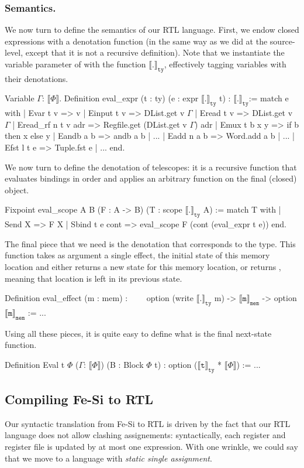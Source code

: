 \documentclass{llncs}
\newcommand{\denote}[1]{\llbracket #1 \rrbracket}
\newcommand{\denotety}[1]{\denote{\mathtt{#1}}_{\mathtt{ty}}}
\newcommand{\denotemem}[1]{\denote{\mathtt{#1}}_{\mathtt{mem}}}
\begin{document}
\subsubsection{Semantics.} We now turn to define the semantics of our RTL
language. 
%
First, we endow closed expressions with a denotation function (in the
same way as we did at the source-level, except that it is not a
recursive definition).
%
Note that we instantiate the variable parameter of  with
the function $\denotety{.}$, effectively tagging variables with their
denotations.

\begin{mcoq}
Variable $\Gamma$: $\denote{\Phi}$. 
Definition eval_expr (t : ty) (e : expr $\denotety{.}$ t) : $\denotety{.}$:=
match e with
| Evar t v => v
| Einput t v => DList.get v $\Gamma$
| Eread  t v =>  DList.get v $\Gamma$
| Eread_rf n t v adr => Regfile.get (DList.get v $\Gamma$) adr
| Emux t b x y => if b then x else y 
| Eandb a b => andb a b | ...
| Eadd n a b => Word.add a b  | ...
| Efst l t e => Tuple.fst e | ...
end. 
\end{mcoq}

We now turn to define the denotation of telescopes: it is a
recursive function that evaluates bindings in order and applies
an arbitrary function on the final (closed) object. 
\begin{mcoq}
Fixpoint eval_scope {A B} (F : A -> B) (T : scope $\denotety{.}$ A) :=
match T with 
| Send X => F X
| Sbind t e cont => eval_scope F (cont (eval_expr t e))
end.   
\end{mcoq}
%
The final piece that we need is the denotation that corresponds to the
 type. This function takes as argument a single effect,
the initial state of this memory location  and either returns a new
state for this memory location, or returns , meaning that
location is left in its previous state.
\begin{mcoq}
Definition eval_effect (m : mem) : 
$\qquad$option (write $\denotety{.}$ m) -> $\denotemem{m}$ -> option $\denotemem{m}$ := ... 
\end{mcoq}
%
Using all these pieces, it is quite easy to define what is the final
next-state function. 
\begin{mcoq}
Definition Eval {t} {$\Phi$} ($\Gamma$: $\denote{\Phi}$) (B : Block $\Phi$ t) : option ($\denotety{t}$ * $\denote{\Phi}$) := ...
\end{mcoq}

\subsection{Compiling Fe-Si to RTL} 
Our syntactic translation from Fe-Si to RTL is driven by the fact that
our RTL language does not allow clashing assignements: syntactically,
each register and register file is updated by at most one 
expression.
%
With one wrinkle, we could say that we move to a language with
\emph{static single assignment}. 
\end{document}
